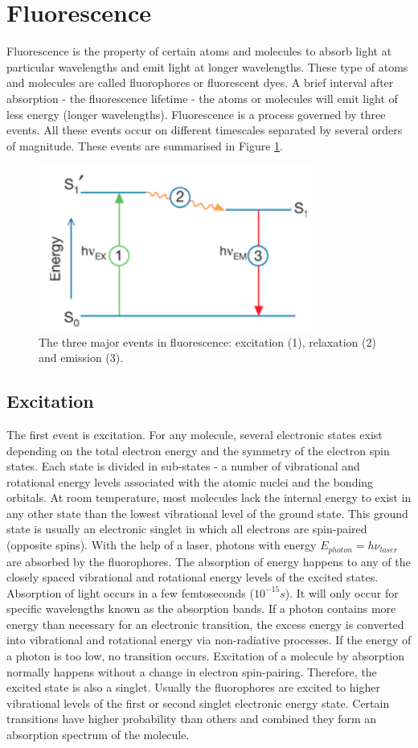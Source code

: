 \documentclass[twoside,single]{lion-msc}
\begin{document}
\section{Fluorescence}
Fluorescence is the property of certain atoms and molecules to absorb light at particular wavelengths and emit light at longer wavelengths. These type of atoms and molecules are called fluorophores or fluorescent dyes. A brief interval after absorption - the fluorescence lifetime - the atoms or molecules will emit light of less energy (longer wavelengths).  Fluorescence is a process governed by three events. All these events occur on different timescales separated by several orders of magnitude. These events are summarised in Figure \ref{fluor}.
\begin{figure}[ht!]
\centering
\includegraphics[width=90mm]{fluorescence.jpg}
\caption{The three major events in fluorescence: excitation (1), relaxation (2) and emission (3).} 
\label{fluor}
\end{figure}

\subsection{Excitation}
The first event is excitation. For any molecule, several electronic states exist depending on the total electron energy and the symmetry of the electron spin states. Each state is divided in sub-states - a number of vibrational and rotational energy levels associated with the atomic nuclei and the bonding orbitals. At room temperature, most molecules lack the internal energy to exist in any other state than the lowest vibrational level of the ground state. This ground state is usually an electronic singlet in which all electrons are spin-paired (opposite spins). With the help of a laser, photons with energy $E_{photon}=h \nu_{laser}$ are absorbed by the fluorophores. The absorption of energy happens to any of the closely spaced vibrational and rotational energy levels of the excited states. Absorption of light occurs in a few femtoseconds ($10^{-15}s$). It will only occur for specific wavelengths known as the absorption bands. If a photon contains more energy than necessary for an electronic transition, the excess energy is converted into vibrational and rotational energy via non-radiative processes. If the energy of a photon is too low, no transition occurs. Excitation of a molecule by absorption normally happens without a change in electron spin-pairing. Therefore, the excited state is also a singlet. Usually the fluorophores are excited to higher vibrational levels of the first or second singlet electronic energy state. Certain transitions have higher probability than others and combined they form an absorption spectrum of the molecule.
\end{document}
